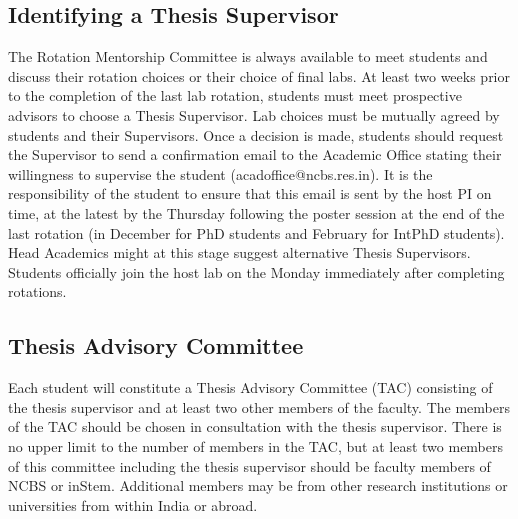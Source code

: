 \documentclass[a4paper,10pt]{article}
\begin{document}
\subsection{Identifying a Thesis Supervisor} The Rotation Mentorship Committee is
always available to meet students and discuss their rotation choices or their
choice of final labs. At least two weeks prior to the completion of the last lab
rotation, students must meet prospective advisors to choose a Thesis Supervisor.
Lab choices must be mutually agreed by students and their Supervisors. Once a
decision is made, students should request the Supervisor to send a confirmation
email to the Academic Office stating their willingness to supervise the student
(acadoffice@ncbs.res.in). It is the responsibility of the student to ensure that
this email is sent by the host PI on time, at the latest by the Thursday
following the poster session at the end of the last rotation (in December for
PhD students and February for IntPhD students). Head Academics might at this
stage suggest alternative Thesis Supervisors.  Students officially join the host
lab on the Monday immediately after completing rotations.  


\subsection{Thesis Advisory Committee}
Each student will constitute a Thesis Advisory Committee (TAC)
consisting of the thesis supervisor and at least two other members of the
faculty. The members of the TAC should be chosen in consultation with the thesis
supervisor. There is no upper limit to the number of members in the TAC, but at
least two members of this committee including the thesis supervisor should be
faculty members of NCBS or inStem.  Additional members may be from other
research institutions or universities from within India or abroad.
\end{document}
